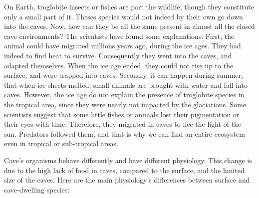 \documentclass[draft, final]{report}
\begin{document}
On Earth, troglobite insects or fishes are part the wildlife, though they constitute only a small part of it. Theses species would not indeed by their own go down into the caves. Now, how can they be all the same present in almost all the closed cave environments? The scientists have found some explanations. First, the animal could have migrated millions years ago, during the ice ages. They had indeed to find heat to survive. Consequently they went into the caves, and adapted themselves. When the ice age ended, they could not rise up to the surface, and were trapped into caves. Secondly, it can happen during summer, that when ice sheets melted, small animals are brought with water and fall into caves. However, the ice age do not explain the presence of troglobite species in the tropical area, since they were nearly not impacted by the glaciations. Some scientists suggest that some little fishes or animals lost their pigmentation or their eyes with time. Therefore, they migrated in caves to flee the light of the sun. Predators followed them, and that is why we can find an entire ecosystem even in tropical or sub-tropical areas.
\par
Cave’s organisms behave differently and have different physiology. This change is due to the high lack of food in caves, compared to the surface, and the limited size of the caves. Here are the main physiology’s differences between surface and cave-dwelling species:
\end{document}
